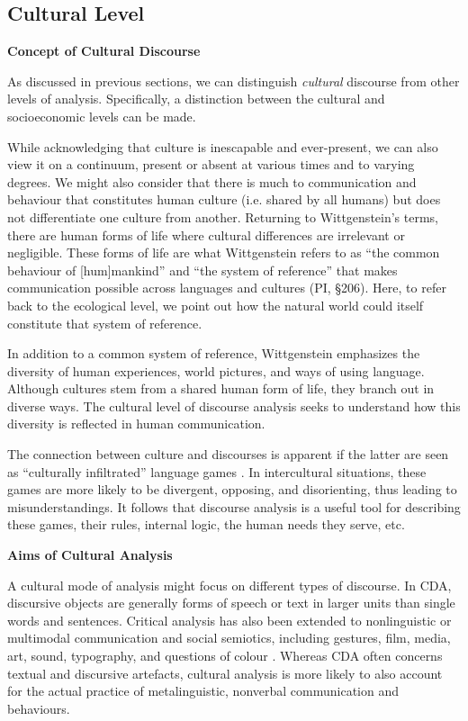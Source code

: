 \subsection{Cultural Level}

\textbf{Concept of Cultural Discourse}

As discussed in previous sections, we can distinguish \textit{cultural} discourse from other levels of analysis. Specifically, a distinction between the cultural and socioeconomic levels can be made. 

While acknowledging that culture is inescapable and ever-present, we can also view it on a continuum, present or absent at various times and to varying degrees. We might also consider that there is much to communication and behaviour that constitutes human culture (i.e. shared by all humans) but does not differentiate one culture from another. Returning to Wittgenstein's terms, there are human forms of life where cultural differences are irrelevant or negligible. These forms of life are what Wittgenstein refers to as ``the common behaviour of [hum]mankind'' and ``the system of reference'' that makes communication possible across languages and cultures (PI, \S 206). Here, to refer back to the ecological level, we point out how the natural world could itself constitute that system of reference.

In addition to a common system of reference, Wittgenstein emphasizes the diversity of human experiences, world pictures, and ways of using language. Although cultures stem from a shared human form of life, they branch out in diverse ways. The cultural level of discourse analysis seeks to understand how this diversity is reflected in human communication. 

The connection between culture and discourses is apparent if the latter are seen as ``culturally infiltrated'' language games \citep[5]{Shi-xu2005a}. In intercultural situations, these games are more likely to be divergent, opposing, and disorienting, thus leading to misunderstandings. It follows that discourse analysis is a useful tool for describing these games, their rules, internal logic, the human needs they serve, etc.  

\textbf{Aims of Cultural Analysis}

A cultural mode of analysis might focus on different types of discourse. In CDA, discursive objects are generally forms of speech or text in larger units than single words and sentences. Critical analysis has also been extended to nonlinguistic or multimodal communication and social semiotics, including gestures, film, media, art, sound, typography, and questions of colour \citep[2, 15]{Wodak2009}. Whereas CDA often concerns textual and discursive artefacts, cultural analysis is more likely to also account for the actual practice of metalinguistic, nonverbal communication and behaviours.	


